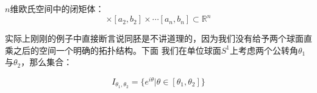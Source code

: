 \documentclass[lang=cn,10pt,device=pad]{elegantbook}
\newcommand{\dkh}[1]{\{#1\}}
\begin{document}
\begin{example}[$n$维欧氏空间中的闭矩体]
	$n$维欧氏空间中的闭矩体：
	\begin{equation*}
		[a_1,b_1]\times[a_2,b_{2}]\times \cdots [a_{n},b_{n}]\subset \mathbb{R}^{n}
	\end{equation*}
\end{example}
\begin{example}[轮胎面]
	实际上刚刚的例子中直接断言说同胚是不讲道理的，因为我们没有给予两个球面直乘之后的空间一个明确的拓扑结构。下面 我们在单位球面$S^{1}$上考虑两个公转角$\theta_{1}$与$\theta_{2}$，那么集合：
	
	\begin{equation*}
		I_{\theta_{1},\theta_{2}} = \dkh{e^{i\theta}|\theta\in [\theta_{1},\theta_2]}
	\end{equation*}
	
	
	\begin{figure}[h]
		\centering
		


\begin{tikzpicture}[x=0.75pt,y=0.75pt,yscale=-1,xscale=1]


\end{tikzpicture}
\end{figure}
\end{example}
\end{document}
